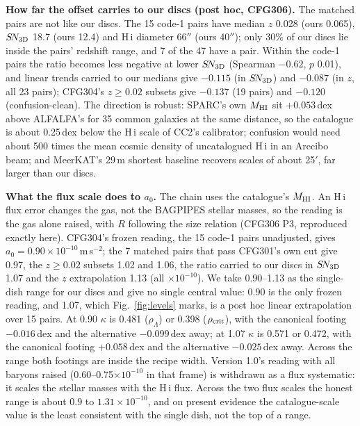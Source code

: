 \documentclass[10pt]{article}
\begin{document}
\textbf{How far the offset carries to our discs (post hoc, CFG306).} The matched pairs are not like our discs. The 15 code-1 pairs have median $z$ 0.028 (ours 0.065), $S\!N_{\rm 3D}$ 18.7 (ours 12.4) and H\,{\sc i} diameter 66$''$ (ours 40$''$); only 30\% of our discs lie inside the pairs' redshift range, and 7 of the 47 have a pair. Within the code-1 pairs the ratio becomes less negative at lower $S\!N_{\rm 3D}$ (Spearman $-0.62$, $p$ 0.01), and linear trends carried to our medians give $-0.115$ (in $S\!N_{\rm 3D}$) and $-0.087$ (in $z$, all 23 pairs); CFG304's $z\ge0.02$ subsets give $-0.137$ (19 pairs) and $-0.120$ (confusion-clean). The direction is robust: SPARC's own $M_{\rm HI}$ sit $+0.053$\,dex above ALFALFA's for 35 common galaxies at the same distance, so the catalogue is about 0.25\,dex below the H\,{\sc i} scale of CC2's calibrator; confusion would need about 500 times the mean cosmic density of uncatalogued H\,{\sc i} in an Arecibo beam; and MeerKAT's 29\,m shortest baseline recovers scales of about 25$'$, far larger than our discs.

\textbf{What the flux scale does to $a_0$.} The chain uses the catalogue's $M_{\rm HI}$. An H\,{\sc i} flux error changes the gas, not the BAGPIPES stellar masses, so the reading is the gas alone raised, with $R$ following the size relation (CFG306 P3, reproduced exactly here). CFG304's frozen reading, the 15 code-1 pairs unadjusted, gives $a_0=0.90\times10^{-10}$\,m\,s$^{-2}$; the 7 matched pairs that pass CFG301's own cut give 0.97, the $z\ge0.02$ subsets 1.02 and 1.06, the ratio carried to our discs in $S\!N_{\rm 3D}$ 1.07 and the $z$ extrapolation 1.13 (all $\times10^{-10}$). We take 0.90--1.13 as the single-dish range for our discs and give no single central value: 0.90 is the only frozen reading, and 1.07, which Fig.~\ref{fig:levels} marks, is a post hoc linear extrapolation over 15 pairs. At 0.90 $\kappa$ is 0.481 ($\rho_\Lambda$) or 0.398 ($\rho_{\rm crit}$), with the canonical footing $-0.016$\,dex and the alternative $-0.099$\,dex away; at 1.07 $\kappa$ is 0.571 or 0.472, with the canonical footing $+0.058$\,dex and the alternative $-0.025$\,dex away. Across the range both footings are inside the recipe width. Version 1.0's reading with all baryons raised (0.60--0.75$\times10^{-10}$ in that frame) is withdrawn as a flux systematic: it scales the stellar masses with the H\,{\sc i} flux. Across the two flux scales the honest range is about 0.9 to $1.31\times10^{-10}$, and on present evidence the catalogue-scale value is the least consistent with the single dish, not the top of a range.
\end{document}
